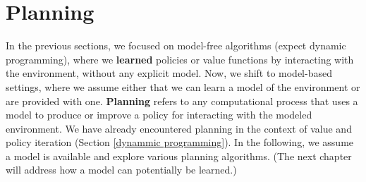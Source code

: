 \section{Planning}
In the previous sections, we focused on model-free algorithms (expect dynamic programming), where we \textbf{learned} policies or value 
functions by interacting with the environment, without any explicit model. Now, we shift to model-based settings, where we assume 
either that we can learn a model of the environment or are provided with one.\newline
\textbf{Planning} refers to any computational process that uses a model to produce or 
improve a policy for interacting with the modeled environment. We have already encountered 
planning in the context of value and policy iteration (Section \ref{dynammic programming}). 
In the following, we assume a model is available and explore various planning algorithms. 
(The next chapter will address how a model can potentially be learned.)

